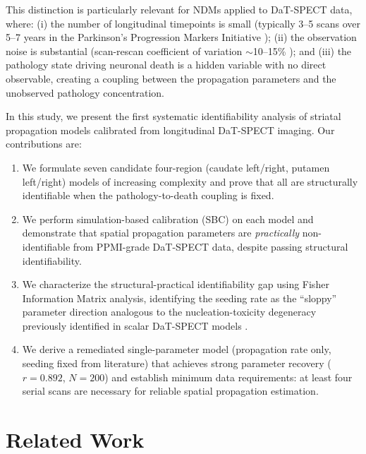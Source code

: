 This distinction is particularly relevant for NDMs applied to DaT-SPECT data, where: (i) the number of longitudinal timepoints is small (typically 3--5 scans over 5--7 years in the Parkinson's Progression Markers Initiative \cite{ppmi2011}); (ii) the observation noise is substantial (scan-rescan coefficient of variation $\sim$10--15\% \cite{tossicibolt2017}); and (iii) the pathology state driving neuronal death is a hidden variable with no direct observable, creating a coupling between the propagation parameters and the unobserved pathology concentration.

In this study, we present the first systematic identifiability analysis of striatal propagation models calibrated from longitudinal DaT-SPECT imaging. Our contributions are:

\begin{enumerate}
\item We formulate seven candidate four-region (caudate left/right, putamen left/right) models of increasing complexity and prove that all are structurally identifiable when the pathology-to-death coupling is fixed.
\item We perform simulation-based calibration (SBC) \cite{talts2018} on each model and demonstrate that spatial propagation parameters are \textit{practically} non-identifiable from PPMI-grade DaT-SPECT data, despite passing structural identifiability.
\item We characterize the structural-practical identifiability gap using Fisher Information Matrix analysis, identifying the seeding rate as the ``sloppy'' parameter direction \cite{gutenkunst2007} analogous to the nucleation-toxicity degeneracy previously identified in scalar DaT-SPECT models \cite{dupre2026phase2}.
\item We derive a remediated single-parameter model (propagation rate only, seeding fixed from literature) that achieves strong parameter recovery ($r = 0.892$, $N = 200$) and establish minimum data requirements: at least four serial scans are necessary for reliable spatial propagation estimation.
\end{enumerate}

\section{Related Work}


